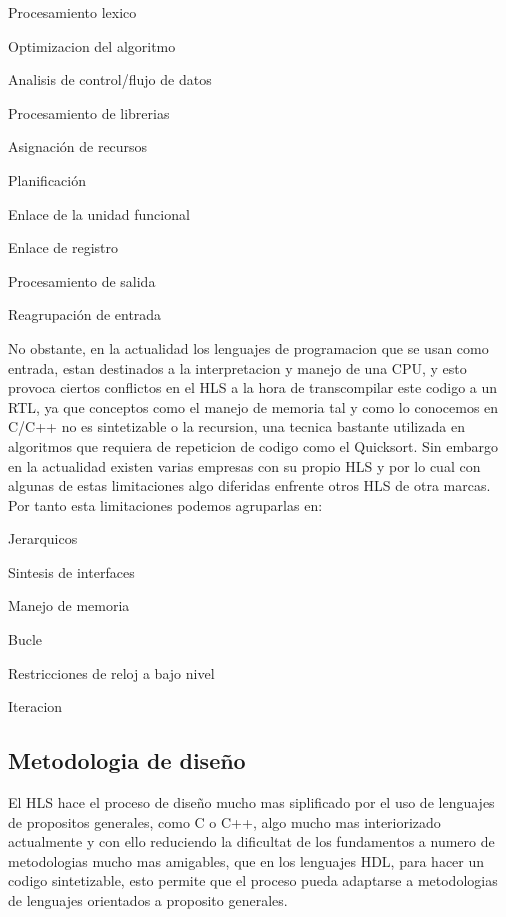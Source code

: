 \documentclass[11pt,spanish,listoffigures,listoftables]{tfgetsinf}
\newenvironment{no_desc}{
   \begin{itemize}
      \setlength{\itemsep}{0.2pt}
}{\end{itemize}}
\begin{document}
   \begin{no_desc}
      \item Procesamiento lexico
      \item Optimizacion del algoritmo
      \item Analisis de control/flujo de datos
      \item Procesamiento de librerias
      \item Asignación de recursos
      \item Planificación
      \item Enlace de la unidad funcional
      \item Enlace de registro
      \item Procesamiento de salida
      \item Reagrupación de entrada 
   \end{no_desc}

   No obstante, en la actualidad los lenguajes de programacion que se usan como
   entrada, estan destinados a la interpretacion y manejo de una CPU, y esto
   provoca ciertos conflictos en el HLS a la hora de transcompilar este codigo a
   un RTL, ya que conceptos como el manejo de memoria tal y como lo conocemos en
   C/C++ no es sintetizable o la recursion, una tecnica bastante utilizada en
   algoritmos que requiera de repeticion de codigo como el Quicksort. Sin
   embargo en la actualidad existen varias empresas con su propio HLS y por lo
   cual con algunas de estas limitaciones algo diferidas enfrente otros HLS de otra
   marcas. Por tanto esta limitaciones podemos agruparlas en:

   \begin{no_desc} 
      \item Jerarquicos
      \item Sintesis de interfaces
      \item Manejo de memoria
      \item Bucle
      \item Restricciones de reloj a bajo nivel
      \item Iteracion
   \end{no_desc}

   \newpage

   \subsection{Metodologia de dise\~{n}o} \label{md_hls}

      El HLS hace el proceso de diseño mucho mas siplificado por el uso de
      lenguajes de propositos generales, como C o C++, algo mucho mas
      interiorizado actualmente y con ello reduciendo la dificultat de los
      fundamentos a numero de metodologias mucho mas amigables, que en los
      lenguajes HDL, para hacer un codigo sintetizable, esto permite que el
      proceso pueda adaptarse a metodologias de lenguajes orientados a proposito
      generales.
\end{document}
